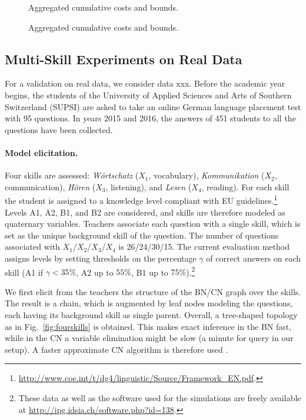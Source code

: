 \documentclass[runningheads]{llncs}
\begin{document}
\begin{figure}[htp!]
\centering

\hspace{0.9cm}
\caption{Aggregated cumulative costs and bounds.}
\label{fig:sx2}
\end{figure}

\begin{figure}[htp!]
\centering

\caption{Aggregated cumulative costs and bounds.}
\label{fig:sx}
\end{figure}

\subsection{Multi-Skill Experiments on Real Data}
For a validation on real data, we consider data xxx. Before the academic year begins, the students of the University of Applied Sciences and Arts of Southern Switzerland (SUPSI) are asked to take an online German language placement test with 95 questions. In years 2015 and 2016, the answers of 451 students to all the questions have been collected. 
	
\paragraph{Model elicitation.}
Four skills are assessed: \textit{W\"ortschatz} ($X_1$, vocabulary), 
\textit{Kommunikation} ($X_2$, communication), \textit{H\"oren} ($X_3$, listening), and \textit{Lesen} ($X_4$, reading). For each skill the student is assigned to a knowledge 
	level compliant with EU 
	guidelines.\footnote{\url{http://www.coe.int/t/dg4/linguistic/Source/Framework_EN.pdf}.}
	Levels A1, A2, B1, and B2 are considered, and skills are therefore modeled as 
	quaternary variables.
	Teachers associate each question with a single skill, which is set as the unique 
	background skill of the question. The number of questions associated with 
	$X_1$/$X_2$/$X_3$/$X_4$ is 26/24/30/15. The current evaluation method assigns 
	levels by setting thresholds on the percentage $\gamma$ of correct answers on each 
	skill (A1 if  $\gamma < 35\%$, A2 up to $55\%$, B1 up to $75\%$).\footnote{These data 
	as well as the software used for the simulations are freely available at 
	\url{http://ipg.idsia.ch/software.php?id=138}.}
	
	We first elicit from the teachers the structure of the BN/CN graph over the skills. The 
	result is a chain, which is augmented by leaf nodes modeling the questions, each 
	having its background skill as single parent. Overall, a tree-shaped topology as in 
	Fig.~\ref{fig:fourskills} is obtained. This makes exact inference in the BN fast, while in 
	the CN a variable elimination might be slow (a minute for query in our setup). A faster 
	approximate CN algorithm is therefore used \cite{antonucci2014e}.
	
\end{document}
